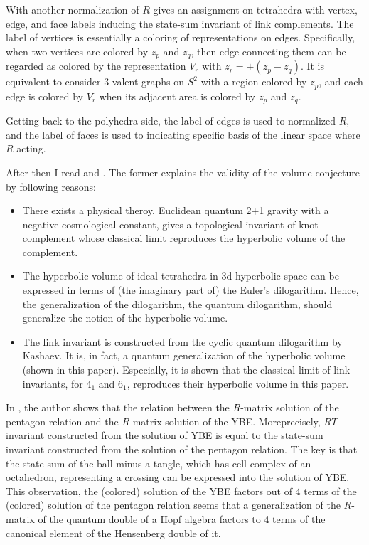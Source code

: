 \documentclass[11pt]{amsart}
\begin{document}
With another normalization of $R$ gives an assignment on tetrahedra with vertex, edge, and face labels inducing the state-sum invariant of link complements.
The label of vertices is essentially a coloring of representations on edges.
Specifically, when two vertices are colored by $z_p$ and $z_q$, then edge connecting them can be regarded as colored by the representation $V_r$ with $z_r = \pm (z_p - z_q)$.
It is equivalent to consider $3$-valent graphs on $S^2$ with a region colored by $z_p$, and each edge is colored by $V_r$ when its adjacent area is colored by $z_p$ and $z_q$.

Getting back to the polyhedra side, the label of edges is used to normalized $R$, and the label of faces is used to indicating specific basis of the linear space where $R$ acting.

\par\vspace{1em}

After then I read \cite{Kashaev-1997-VC} and \cite{Kashaev-1995-LinkQudilog}.
The former explains the validity of the volume conjecture by following reasons:
\begin{itemize}
    \item There exists a physical theroy, Euclidean quantum 2+1 gravity with a negative cosmological constant, gives a topological invariant of knot complement whose classical limit reproduces the hyperbolic volume of the complement.
    
    \item The hyperbolic volume of ideal tetrahedra in 3d hyperbolic space can be expressed in terms of (the imaginary part of) the Euler's dilogarithm.
    Hence, the generalization of the dilogarithm, the quantum dilogarithm, should generalize the notion of the hyperbolic volume.
    
    \item The link invariant is constructed from the cyclic quantum dilogarithm by Kashaev.
    It is, in fact, a quantum generalization of the hyperbolic volume (shown in this paper).
    Especially, it is shown that the classical limit of link invariants, for $4_1$ and $6_1$, reproduces their hyperbolic volume in this paper.
\end{itemize}

In \cite{Kashaev-1995-LinkQudilog}, the author shows that the relation between the $R$-matrix solution of the pentagon relation and the $R$-matrix solution of the YBE.
Moreprecisely, $RT$-invariant constructed from the solution of YBE is equal to the state-sum invariant constructed from the solution of the pentagon relation.
The key is that the state-sum of the ball minus a tangle, which has cell complex of an octahedron, representing a crossing can be expressed into the solution of YBE.
This observation, the (colored) solution of the YBE factors out of 4 terms of the (colored) solution of the pentagon relation seems that a generalization of the $R$-matrix of the quantum double of a Hopf algebra factors to 4 terms of the canonical element of the Hensenberg double of it.
\end{document}
